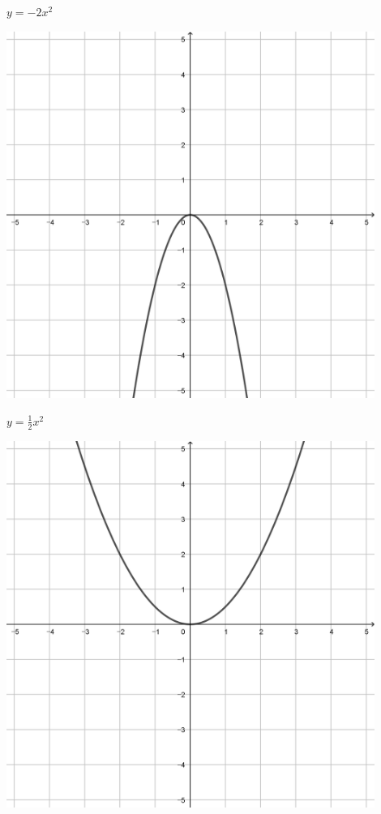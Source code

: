 \documentclass[a4paper]{oblivoir}
\begin{document}
\clearpage
\begin{minipage}{0.45\textwidth}\centering
\(y=-2x^2\)
\par\bigskip\includegraphics[width=0.9\textwidth]{img/7-1}
\end{minipage}
\begin{minipage}{0.45\textwidth}\centering
\(y=\frac12x^2\)
\par\bigskip\includegraphics[width=0.9\textwidth]{img/7-2}
\end{minipage}\bigskip\bigskip\par
\end{document}
